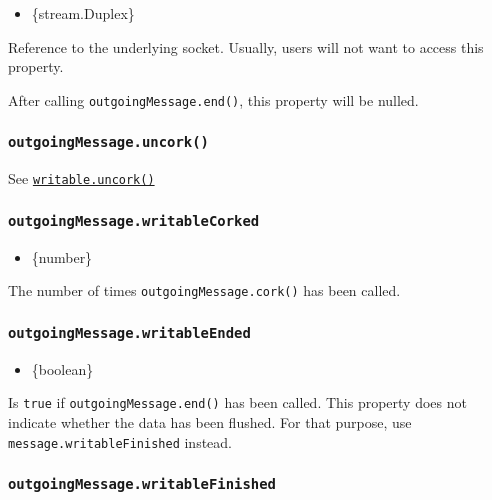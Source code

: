 \begin{itemize}
\tightlist
\item
  \{stream.Duplex\}
\end{itemize}

Reference to the underlying socket. Usually, users will not want to
access this property.

After calling \texttt{outgoingMessage.end()}, this property will be
nulled.

\subsubsection{\texorpdfstring{\texttt{outgoingMessage.uncork()}}{outgoingMessage.uncork()}}\label{outgoingmessage.uncork}

See \href{stream.md\#writableuncork}{\texttt{writable.uncork()}}

\subsubsection{\texorpdfstring{\texttt{outgoingMessage.writableCorked}}{outgoingMessage.writableCorked}}\label{outgoingmessage.writablecorked}

\begin{itemize}
\tightlist
\item
  \{number\}
\end{itemize}

The number of times \texttt{outgoingMessage.cork()} has been called.

\subsubsection{\texorpdfstring{\texttt{outgoingMessage.writableEnded}}{outgoingMessage.writableEnded}}\label{outgoingmessage.writableended}

\begin{itemize}
\tightlist
\item
  \{boolean\}
\end{itemize}

Is \texttt{true} if \texttt{outgoingMessage.end()} has been called. This
property does not indicate whether the data has been flushed. For that
purpose, use \texttt{message.writableFinished} instead.

\subsubsection{\texorpdfstring{\texttt{outgoingMessage.writableFinished}}{outgoingMessage.writableFinished}}\label{outgoingmessage.writablefinished}

